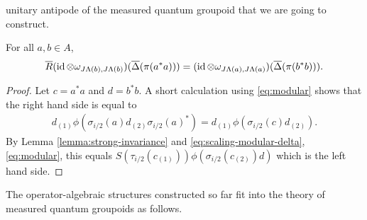unitary antipode of the measured quantum groupoid that we are going to
construct.
\begin{Lem} \label{lemma:vn-r-characterisation}
For all $a,b\in A$,
\begin{align*}
  \overline{R}(\operatorname{id} \otimes
  \omega_{J\Lambda(b),J\Lambda(b)})(\overline{\Delta}(\pi(a^{*}a))) = (\operatorname{id}
  \otimes \omega_{J\Lambda(a),J\Lambda(a)})(\overline{\Delta}(\pi(b^{*}b))).
\end{align*}
\end{Lem}
\begin{proof}
Let $c=a^{*}a$ and $d=b^{*}b$. 
A short calculation using \eqref{eq:modular} shows that  the right hand side is equal to
  \begin{align*}
    d_{(1)}\phi(\sigma_{i/2}(a)d_{(2)}\sigma_{i/2}(a)^{*})
    = d_{(1)}\phi(\sigma_{i/2}(c)d_{(2)}).
  \end{align*}
By Lemma \ref{lemma:strong-invariance} and
  \eqref{eq:scaling-modular-delta}, \eqref{eq:modular},  this equals 
  $S(\tau_{i/2}(c_{(1)}))
    \phi(\sigma_{i/2}(c_{(2)})d)$
which is the  left hand side.
\end{proof}

The operator-algebraic structures constructed so far fit into the
theory of measured quantum groupoids as follows.

